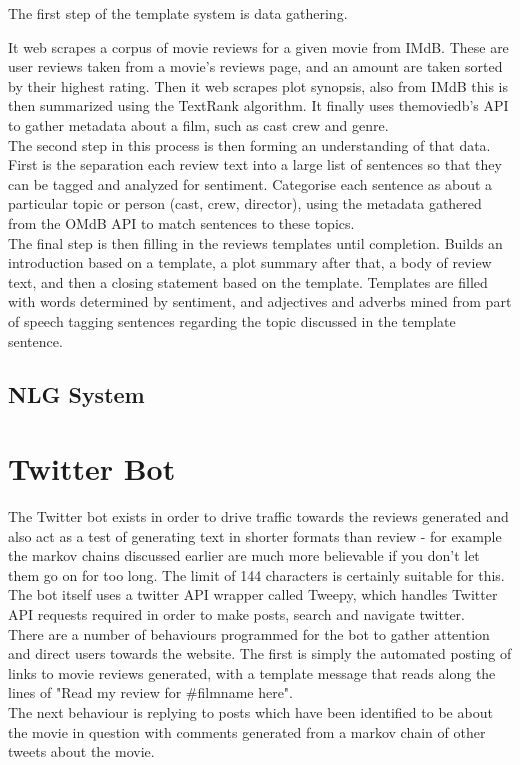 The first step of the template system is data gathering.

It web scrapes a corpus of movie reviews for a given movie from IMdB. These are user reviews taken from a movie's reviews page, and an amount are taken sorted by their highest rating. Then it web scrapes plot synopsis, also from IMdB this is then summarized using the TextRank algorithm. It finally uses themoviedb's API to gather metadata about a film, such as cast crew and genre.\\


The second step in this process is then forming an understanding of that data.
First is the separation each review text into a large list of sentences so that they can be tagged and analyzed for sentiment.
Categorise each sentence as about a particular topic or person (cast, crew, director), using the metadata gathered from the OMdB API to match sentences to these topics.\\

The final step is then filling in the reviews templates until completion.
Builds an introduction based on a template, a plot summary after that, a body of review text, and then a closing statement based on the template.
Templates are filled with words determined by sentiment, and adjectives and adverbs mined from part of speech tagging sentences regarding the topic discussed in the template sentence.\\


\subsection{NLG System}

\section{Twitter Bot}
The Twitter bot exists in order to drive traffic towards the reviews generated and also act as a test of generating text in shorter formats than review - for example the markov chains discussed earlier are much more believable if you don't let them go on for too long. The limit of 144 characters is certainly suitable for this.\\
The bot itself uses a twitter API wrapper called Tweepy, which handles Twitter API requests required in order to make posts, search and navigate twitter.\\
There are a number of behaviours programmed for the bot to gather attention and direct users towards the website. The first is simply the automated posting of links to movie reviews generated, with a template message that reads along the lines of "Read my review for #filmname here".\\
The next behaviour is replying to posts which have been identified to be about the movie in question with comments generated from a markov chain of other tweets about the movie.\\ 


